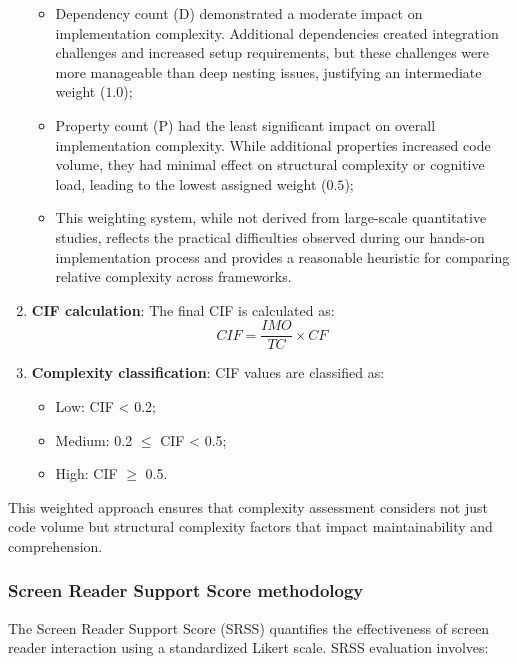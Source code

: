 \begin{enumerate}
    \begin{itemize}
        \item Dependency count (D) demonstrated a moderate impact on implementation complexity. Additional dependencies created integration challenges and increased setup requirements, but these challenges were more manageable than deep nesting issues, justifying an intermediate weight ($1.0$);

        \item Property count (P) had the least significant impact on overall implementation complexity. While additional properties increased code volume, they had minimal effect on structural complexity or cognitive load, leading to the lowest assigned weight ($0.5$);

        \item This weighting system, while not derived from large-scale quantitative studies, reflects the practical difficulties observed during our hands-on implementation process and provides a reasonable heuristic for comparing relative complexity across frameworks.
    \end{itemize}

    \item \textbf{CIF calculation}: The final CIF is calculated as:
    \begin{equation}
    CIF = \frac{IMO}{TC} \times CF
    \end{equation}
    
    \item \textbf{Complexity classification}: CIF values are classified as:
    \begin{itemize}
        \item Low: CIF < 0.2;
        \item Medium: 0.2 $\leq$ CIF < 0.5;
        \item High: CIF $\geq$ 0.5.
    \end{itemize}
\end{enumerate}

This weighted approach ensures that complexity assessment considers not just code volume but structural complexity factors that impact maintainability and comprehension.

\subsubsection{Screen Reader Support Score methodology}
\label{subsubsec:srss-methodology}

The Screen Reader Support Score (SRSS) quantifies the effectiveness of screen reader interaction using a standardized Likert scale. SRSS evaluation involves:

